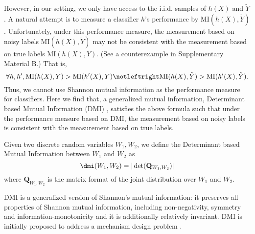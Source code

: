 However, in our setting, we only have access to the i.i.d. samples of $h(X)$ and $\tilde{Y}$. A natural attempt is to measure a classifier $h$'s performance by $\text{MI}(h(X),\tilde{Y})$. Unfortunately, under this performance measure, the measurement based on noisy labels $\text{MI}(h(X),\tilde{Y})$ may not be consistent with the measurement based on true labels $\text{MI}(h(X),Y)$. (See a counterexample in Supplementary Material B.) That is,
\[ \forall h,h', \text{MI}(h(X),Y)>\text{MI}(h'(X),Y) \notleftright \text{MI}(h(X),\tilde{Y})> \text{MI}(h'(X),\tilde{Y}). \] Thus, we cannot use Shannon mutual information as the performance measure for classifiers. Here we find that, a generalized mutual information, Determinant based Mutual Information (DMI) \cite{Kong2019}, satisfies the above formula such that under the performance measure based on DMI, the measurement based on noisy labels is consistent with the measurement based on true labels.



\begin{definition}\label{def:dmi}
    Given two discrete random variables $W_1, W_2$, we define the Determinant based Mutual Information between $W_1$ and $W_2$ as \[\dmi(W_1, W_2)=|\det(\mathbf{Q}_{W_1,W_2})|\]
    where $\mathbf{Q}_{W_1,W_2}$ is the matrix format of the joint distribution over $W_1$ and $W_2$.   
\end{definition} 

DMI is a generalized version of Shannon's mutual information: it preserves all properties of Shannon mutual information, including non-negativity, symmetry and information-monotonicity and it is additionally relatively invariant. DMI is initially proposed to address a mechanism design problem \cite{Kong2019}. 



